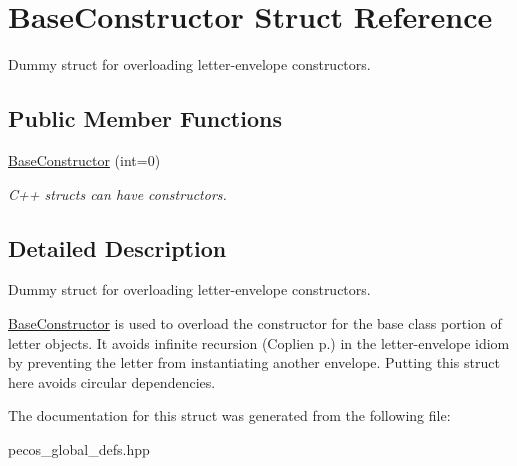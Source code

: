 \section{Base\+Constructor Struct Reference}
\label{structPecos_1_1BaseConstructor}


Dummy struct for overloading letter-\/envelope constructors.  


\subsection*{Public Member Functions}
\begin{DoxyCompactItemize}
\item 
\hyperlink{structPecos_1_1BaseConstructor_ab0cdb827d564618b14ed95d4dec95194}{Base\+Constructor} (int=0)\label{structPecos_1_1BaseConstructor_ab0cdb827d564618b14ed95d4dec95194}

\begin{DoxyCompactList}\small\item\em C++ structs can have constructors. \end{DoxyCompactList}\end{DoxyCompactItemize}


\subsection{Detailed Description}
Dummy struct for overloading letter-\/envelope constructors. 

\hyperlink{structPecos_1_1BaseConstructor}{Base\+Constructor} is used to overload the constructor for the base class portion of letter objects. It avoids infinite recursion (Coplien p.) in the letter-\/envelope idiom by preventing the letter from instantiating another envelope. Putting this struct here avoids circular dependencies. 

The documentation for this struct was generated from the following file\+:\begin{DoxyCompactItemize}
\item 
pecos\+\_\+global\+\_\+defs.\+hpp\end{DoxyCompactItemize}
